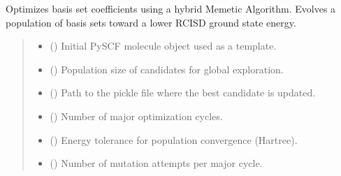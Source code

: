 \documentclass[letterpaper,10pt,english]{sphinxmanual}
\begin{document}
\begin{fulllineitems}
\label{\detokenize{api:MSTOOptpar.OptimizeElement}}
\pysigstartsignatures
\pysiglinewithargsret
{}
{\sphinxparamcomma {}\sphinxparamcomma {}\sphinxparamcomma {}\sphinxparamcomma {}\sphinxparamcomma {}\sphinxparamcomma {}}
{}
\pysigstopsignatures
\sphinxAtStartPar
Optimizes basis set coefficients using a hybrid Memetic Algorithm.
Evolves a population of basis sets toward a lower RCISD ground state energy.
\begin{quote}\begin{description}
\begin{itemize}
\item {} 
\sphinxAtStartPar
{} () \textendash{} Initial PySCF molecule object used as a template.

\item {} 
\sphinxAtStartPar
{} () \textendash{} Population size of candidates for global exploration.

\item {} 
\sphinxAtStartPar
{} () \textendash{} Path to the pickle file where the best candidate is updated.

\item {} 
\sphinxAtStartPar
{} () \textendash{} Number of major optimization cycles.

\item {} 
\sphinxAtStartPar
{} () \textendash{} Energy tolerance for population convergence (Hartree).

\item {} 
\sphinxAtStartPar
{} () \textendash{} Number of mutation attempts per major cycle.


\end{itemize}
\end{description}
\end{quote}
\end{fulllineitems}
\end{document}
